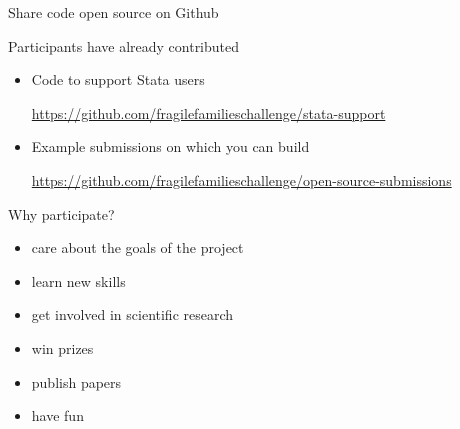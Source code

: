 \documentclass{beamer}
\begin{document}
\begin{frame}{Share code open source on Github}

Participants have already contributed
\begin{itemize}
\item Code to support Stata users \begin{tiny}\textcolor{blue}{\url{https://github.com/fragilefamilieschallenge/stata-support}}\end{tiny}
\item Example submissions on which you can build \begin{tiny}\textcolor{blue}{\url{https://github.com/fragilefamilieschallenge/open-source-submissions}}\end{tiny}
\end{itemize}

\end{frame}
\begin{frame}

Why participate?
\begin{itemize}
\pause
\item care about the goals of the project
\pause
\item learn new skills
\pause
\item get involved in scientific research
\pause
\item win prizes
\pause
\item publish papers
\pause
\item have fun
\end{itemize}

\end{frame}
\end{document}
